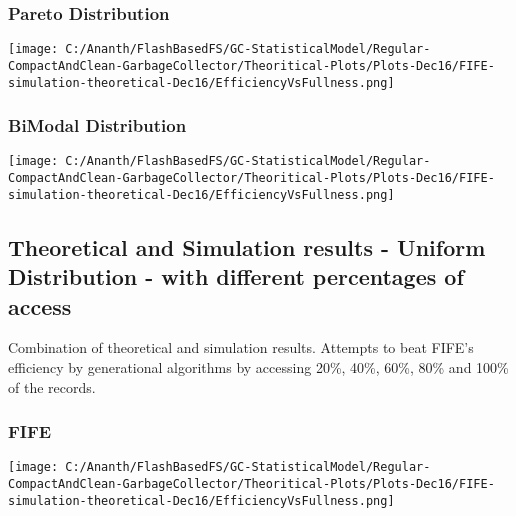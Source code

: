 \subsubsection{Pareto Distribution}
\begin{SCfigure}
	\centering
	\texttt{[image: C:/Ananth/FlashBasedFS/GC-StatisticalModel/Regular-CompactAndClean-GarbageCollector/Theoritical-Plots/Plots-Dec16/FIFE-simulation-theoretical-Dec16/EfficiencyVsFullness.png]}
\end{SCfigure}

\subsubsection{BiModal Distribution}
\begin{SCfigure}
	\centering
	\texttt{[image: C:/Ananth/FlashBasedFS/GC-StatisticalModel/Regular-CompactAndClean-GarbageCollector/Theoritical-Plots/Plots-Dec16/FIFE-simulation-theoretical-Dec16/EfficiencyVsFullness.png]}
\end{SCfigure}


\subsection{Theoretical and Simulation results - Uniform Distribution - with different percentages of access}
	Combination of theoretical and simulation results. Attempts to beat FIFE's efficiency by generational algorithms by accessing 20\%, 40\%, 60\%, 80\% and 100\% of the records.	

\subsubsection{FIFE}
\begin{SCfigure}
	\centering
	\texttt{[image: C:/Ananth/FlashBasedFS/GC-StatisticalModel/Regular-CompactAndClean-GarbageCollector/Theoritical-Plots/Plots-Dec16/FIFE-simulation-theoretical-Dec16/EfficiencyVsFullness.png]}
\end{SCfigure}

